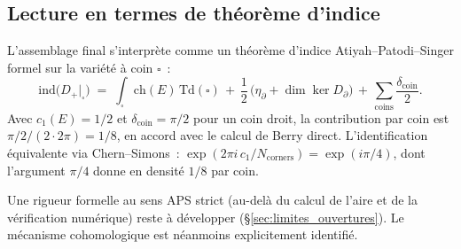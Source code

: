 \subsection{Lecture en termes de théorème d'indice}
\label{sec:indice_APS}

L'assemblage final s'interprète comme un théorème d'indice
Atiyah--Patodi--Singer formel \cite{APS1975} sur la variété à coin
$\square$~:
\begin{equation}
\mathrm{ind}\!\big(D_+|_\square\big) \;=\; \int_{\square} \mathrm{ch}(E)\,\mathrm{Td}(\square) \,+\, \dfrac{1}{2}\,\big(\eta_{\partial} + \dim \ker D_\partial\big) \,+\, \sum_{\mathrm{coins}} \dfrac{\delta_{\mathrm{coin}}}{2}.
\label{eq:APS}
\end{equation}
Avec $c_1(E) = 1/2$ et $\delta_{\mathrm{coin}} = \pi/2$ pour un coin
droit, la contribution par coin est $\pi/2 / (2 \cdot 2\pi) = 1/8$, en
accord avec le calcul de Berry direct. L'identification équivalente via
Chern--Simons~:
$\exp(2\pi i\,c_1/N_{\mathrm{corners}}) = \exp(i\pi/4)$, dont l'argument
$\pi/4$ donne en densité $1/8$ par coin.

Une rigueur formelle au sens APS strict (au-delà du calcul de l'aire et
de la vérification numérique) reste à développer
(\S\ref{sec:limites_ouvertures}). Le mécanisme cohomologique est
néanmoins explicitement identifié.

